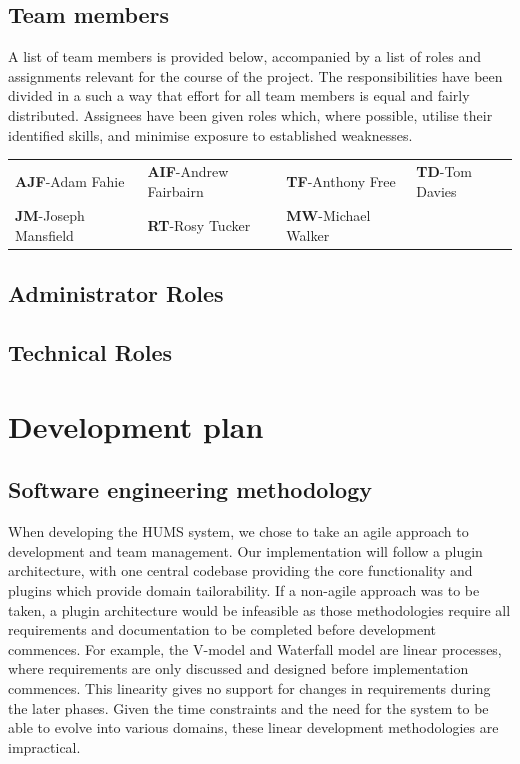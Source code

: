 \documentclass[10pt,a4paper]{article}
\begin{document}
\subsection{Team members}
A list of team members is provided below, accompanied by a list of roles and
assignments relevant for the course of the project. The responsibilities have
been divided in a such a way that effort for all team members is equal and
fairly distributed. Assignees have been given roles which, where possible,
utilise their identified skills, and minimise exposure to established
weaknesses.

\begin{tabular}{ p{4cm} p{4cm} p{4cm} p{4cm} }
	\textbf{AJF}-Adam Fahie & \textbf{AIF}-Andrew Fairbairn &
			\textbf{TF}-Anthony Free & \textbf{TD}-Tom Davies \\
	\textbf{JM}-Joseph Mansfield & \textbf{RT}-Rosy Tucker &
			\textbf{MW}-Michael Walker & \\
\end{tabular}
\subsection{Administrator Roles} 


\subsection{Technical Roles}


\section{Development plan}

\subsection{Software engineering methodology}
When developing the HUMS system, we chose to take an agile approach to
development and team management. Our implementation will follow a plugin
architecture, with one central codebase providing the core functionality and
plugins which provide domain tailorability. If a non-agile approach was to be
taken, a plugin architecture would be infeasible as those methodologies require
all requirements and documentation to be completed before development commences.
For example, the V-model and Waterfall model are linear processes, where
requirements are only discussed and designed before implementation commences.
This linearity gives no support for changes in requirements during the later
phases. Given the time constraints and the need for the system to be able to
evolve into various domains, these linear development methodologies are
impractical.
\end{document}
